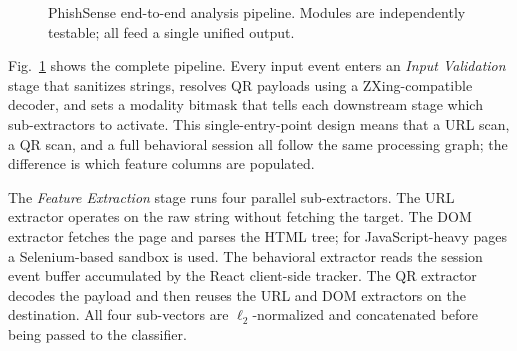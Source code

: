 \documentclass[conference]{IEEEtran}
\begin{document}
\begin{figure}[!t]
\centering
{}
\caption{PhishSense end-to-end analysis pipeline.  Modules are independently testable;
all feed a single unified output.}
\label{fig:arch}
\end{figure}

Fig.~\ref{fig:arch} shows the complete pipeline.
Every input event enters an \textit{Input Validation} stage that sanitizes strings, resolves QR
payloads using a ZXing-compatible decoder, and sets a modality bitmask that tells each downstream
stage which sub-extractors to activate.
This single-entry-point design means that a URL scan, a QR scan, and a full behavioral session
all follow the same processing graph; the difference is which feature columns are populated.

The \textit{Feature Extraction} stage runs four parallel sub-extractors.
The URL extractor operates on the raw string without fetching the target.
The DOM extractor fetches the page and parses the HTML tree; for JavaScript-heavy pages a
Selenium-based sandbox is used.
The behavioral extractor reads the session event buffer accumulated by the React client-side
tracker.
The QR extractor decodes the payload and then reuses the URL and DOM extractors on the destination.
All four sub-vectors are $\ell_2$-normalized and concatenated before being passed to the classifier.
\end{document}
